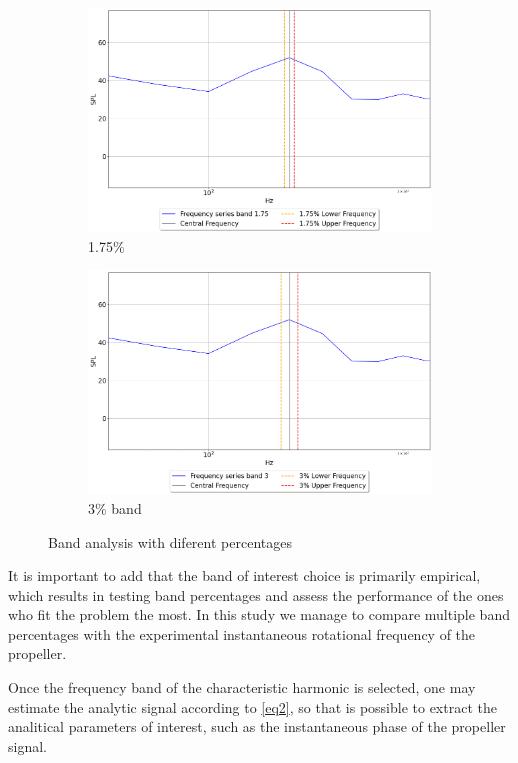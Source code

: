 \documentclass[10pt,fleqn,a4paper,twoside]{article}
\begin{document}
\begin{figure}[h]
\begin{subfigure}{.5\textwidth}
\end{subfigure}
\begin{subfigure}{.5\textwidth}
    \label{fig1c}
    \centering
    \includegraphics[width=0.70\linewidth]{Figures/spectra_band_1.75.png}
    \caption{1.75\%}
    
\end{subfigure}%
\begin{subfigure}{.5\textwidth}
    \label{fig1d}
    \centering
    \includegraphics[width=0.70\linewidth]{Figures/spectra_band_3.png}
    \caption{3\% band}
    
\end{subfigure}%
\caption{Band analysis with diferent percentages}
\label{fig1}
\end{figure}
It is important to add that the band of interest choice is primarily empirical, which results in testing band percentages and assess the performance of the ones who fit the problem the most. In this study we manage to compare multiple band percentages with the experimental instantaneous rotational frequency of the propeller. 

Once the frequency band of the characteristic harmonic is selected, one may estimate the analytic signal according to \ref{eq2}, so that is possible to extract the analitical parameters of interest, such as the instantaneous phase of the propeller signal.
\end{document}

